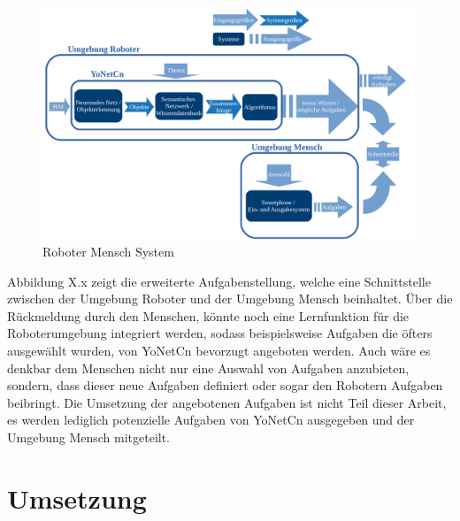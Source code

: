 \begin{figure}[h]
	
	\begin{center}
		
		\includegraphics[width=16cm]{images/Masteridee_3.png}
		
		\caption{Roboter Mensch System}
		
		\label{Roboter_Mensch_System}
		
	\end{center}
	
	
\end{figure}


Abbildung X.x zeigt die erweiterte Aufgabenstellung, welche eine Schnittstelle zwischen der Umgebung Roboter und der Umgebung Mensch beinhaltet. 
Über die Rückmeldung durch den Menschen, könnte noch eine Lernfunktion für die Roboterumgebung integriert werden, sodass beispielsweise Aufgaben die öfters ausgewählt wurden, von YoNetCn bevorzugt angeboten werden. Auch wäre es denkbar dem Menschen nicht nur eine Auswahl von Aufgaben anzubieten, sondern, dass dieser neue Aufgaben definiert oder sogar den Robotern Aufgaben beibringt. 
Die Umsetzung der angebotenen Aufgaben ist nicht Teil dieser Arbeit, es werden lediglich potenzielle Aufgaben von YoNetCn ausgegeben und der Umgebung Mensch mitgeteilt. 





\section{Umsetzung}
\label{sec:umsetzung}





